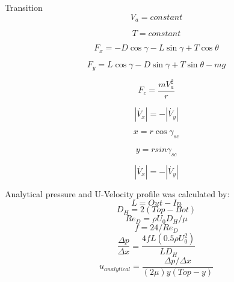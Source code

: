 \documentclass[10pt,english]{article}
\begin{document}
    
 Transition
                \begin{equation}    
V_a = constant
    \end{equation}
    
                    \begin{equation}    
T = constant
    \end{equation}
    
                \begin{equation}    
F_x = -D \cos{\gamma} - L \sin{\gamma} + T \cos{\theta} 
    \end{equation}
    
            \begin{equation}    
F_y = L \cos{\gamma} - D \sin{\gamma} + T \sin{\theta} - m g
    \end{equation}
    
            \begin{equation}    
F_c = \frac{m V_a^2}{r}
    \end{equation}
    
                \begin{equation}    
|\dot{V_x}| = -|\dot{V_y}| 
    \end{equation}
    
    
                    \begin{equation}    
x = r \cos{\gamma_{sc}}
    \end{equation}
    
                        \begin{equation}    
y = r sin{\gamma_{sc}}
    \end{equation}
    
    
                    \begin{equation}    
|\dot{V_x}| = -|\dot{V_y}| 
    \end{equation}

\noindent Analytical pressure and U-Velocity profile was calculated by:
\begin{equation}
            L = Out-In
\end{equation}
\begin{equation}
            D_H = 2 (Top-Bot)
            \end{equation}
            \begin{equation}
            Re_D = \rho U_0 D_H / \mu
            \end{equation}
            \begin{equation}
            f = 24/Re_D
            \end{equation}
            \begin{equation}
            \frac{\Delta p}{\Delta x} = \frac{4 f L (0.5 \rho U_0^2)}{L D_H}
            \end{equation}
            \begin{equation}
            u_{analytical} = \frac{{\Delta p}/{\Delta x}}{(2 \mu) y (Top-y)}
            \end{equation}
\end{document}
